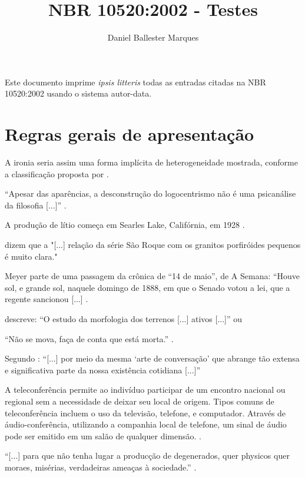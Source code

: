 \documentclass[a4paper]{article}
\title{NBR 10520:2002 - Testes}
\author{Daniel Ballester Marques}
\begin{document}
\maketitle

Este documento imprime \textit{ipsis litteris} todas as entradas citadas na
NBR 10520:2002 usando o sistema autor-data.

\tableofcontents

\clearpage

\setcounter{section}{5}

\section{Regras gerais de apresentação}

A ironia seria assim uma forma implícita de heterogeneidade
mostrada, conforme a classificação proposta por \textcite{authier1982}.

“Apesar das aparências, a desconstrução do logocentrismo não é uma psicanálise
da filosofia [...]” \cite[293]{derrida1967}.

A produção de lítio começa em Searles Lake, Califórnia, em 1928
\cite[513]{mumford1949}.

\textcite[146]{oliveira1943} dizem que a "[...] relação da série São Roque com
os granitos porfiróides pequenos é muito clara."

Meyer parte de uma passagem da crônica de “14 de maio”, de A Semana: “Houve
sol, e grande sol, naquele domingo de 1888, em que o Senado votou a lei, que
a regente sancionou [...] \cite[v. 3, p. 583]{assis1994}.

\textcite[35]{barbour1971} descreve: “O estudo da morfologia dos
terrenos [...] ativos [...]” ou

“Não se mova, faça de conta que está morta.” \cite[72]{clarac1985}.

Segundo \textcite[27]{sa1995}: “[...] por meio da mesma ‘arte de conversação’
que abrange tão extensa e significativa parte da nossa existência cotidiana
[...]”

A teleconferência permite ao indivíduo participar de um encontro
nacional ou regional sem a necessidade de deixar seu local de origem. Tipos
comuns de teleconferência incluem o uso da televisão, telefone, e computador.
Através de áudio-conferência, utilizando a companhia local de telefone, um
sinal de áudio pode ser emitido em um salão de qualquer dimensão.
\cite[181]{nichols1993}.

“[...] para que não tenha lugar a producção de degenerados, quer
physicos quer moraes, misérias, verdadeiras ameaças à sociedade.” \cite[p. 46,
grifo nosso]{souto1916}.
\end{document}
